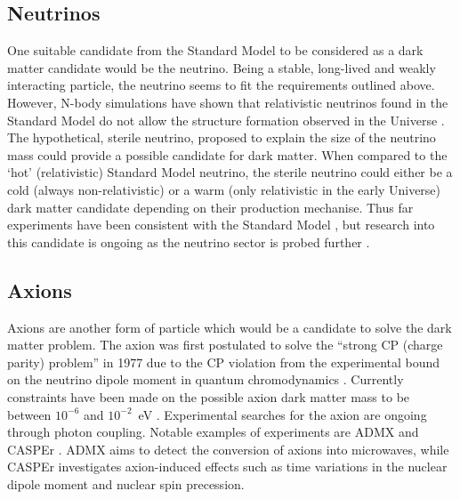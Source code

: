 \subsection{Neutrinos}\label{sec:DMOverview/Neutrinos}
One suitable candidate from the Standard Model to be considered as a dark matter candidate would be the neutrino. Being a stable, long-lived and weakly interacting particle, the neutrino seems to fit the requirements outlined above. However, N-body simulations have shown that relativistic neutrinos found in the Standard Model do not allow the structure formation observed in the Universe \cite{White:1983fcs}. 
The hypothetical, sterile neutrino, proposed to explain the size of the neutrino mass could provide a possible candidate for dark matter. When compared to the `hot' (relativistic) Standard Model neutrino, the sterile neutrino could either be a cold (always non-relativistic) or a warm (only relativistic in the early Universe) dark matter candidate depending on their production mechanise. Thus far experiments have been consistent with the Standard Model \cite{Boyarsky:2018tvu}, but research into this candidate is ongoing as the neutrino sector is probed further \cite{Krasnov:2019kdc}.
\subsection{Axions}\label{sec:DMOverview/Axions}
Axions are another form of particle which would be a candidate to solve the dark matter problem. The axion was first postulated to solve the ``strong CP (charge parity) problem'' in 1977 \cite{ConsvCP} due to the CP violation from the experimental bound on the neutrino dipole moment in quantum chromodynamics \cite{Hook:2018dlk}. Currently constraints have been made on the possible axion dark matter mass to be between $10^{-6}$ and $10^{-2}$~eV \cite{Duffy:2009ig}. Experimental searches for the axion are ongoing through photon coupling. Notable examples of experiments are ADMX \cite{ADMX:2018gho} and CASPEr \cite{JacksonKimball:2017elr}. ADMX aims to detect the conversion of axions into microwaves, while CASPEr investigates axion-induced effects such as time variations in the nuclear dipole moment and nuclear spin precession.

